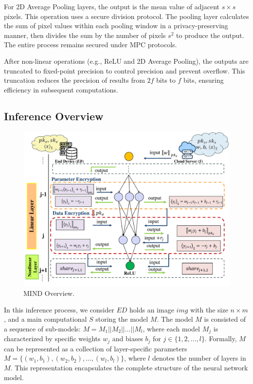 \documentclass[conference]{IEEEtran}
\begin{document}
For 2D Average Pooling layers, the output is the mean value of adjacent $s \times s$ pixels. This operation uses a secure division protocol. The pooling layer calculates the sum of pixel values within each pooling window in a privacy-preserving manner, then divides the sum by the number of pixels $s^2$ to produce the output. The entire process remains secured under MPC protocols.

After non-linear operations (e.g., ReLU and 2D Average Pooling), the outputs are truncated to fixed-point precision to control precision and prevent overflow. This truncation reduces the precision of results from $2f$ bits to $f$ bits, ensuring efficiency in subsequent computations.

\subsection{Inference Overview}


\begin{figure}[ht]
\centering
\includegraphics[scale=0.7]{fig2.pdf}
\caption{MIND Overview.} \label{fig:MIND Overview}
\end{figure}


In this inference process, we consider $ED$ holds an image $img$ with the size $n\times m$, and a main computational $S$ storing the model $M$. The model $M$ is consisted of a sequence of sub-models: $M=M_1 || M_2 || \dots || M_l$, where each model $M_j$ is characterized by specific weights $w_{j}$ and biases $b_{j}$ for $j \in \{1, 2, \dots, l\}$. Formally, $M$ can be represented as a collection of layer-specific parameters $M=\{(w_{1},b_{1}),(w_{2},b_{2}),\dots,(w_{l},b_{l})\}$, where $l$ denotes the number of layers in $M$. This representation encapsulates the complete structure of the neural network model.
\end{document}
